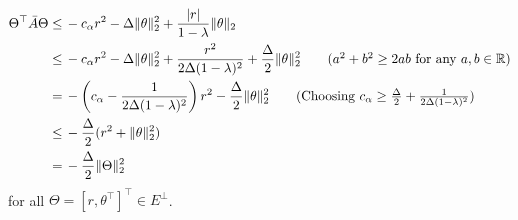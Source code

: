 \documentclass[11 pt]{article}
\begin{document}
\begin{enumerate}
\begin{align}
			\Theta^\top \bar{A}\Theta
			\leq \,&-c_{\alpha}r^2-\Delta\|\theta\|_2^2+\frac{|r|}{1-\lambda}\|\theta\|_2\nonumber\\
			\leq \,&-c_{\alpha}r^2-\Delta\|\theta\|_2^2+\frac{r^2}{2\Delta(1-\lambda)^2}+\frac{\Delta}{2}\|\theta\|_2^2\tag{$a^2+b^2\geq 2ab$ for any $a,b\in\mathbb{R}$}\nonumber\\
			=\,&-\left(c_\alpha-\frac{1}{2\Delta(1-\lambda)^2}\right)r^2-\frac{\Delta}{2}\|\theta\|_2^2\tag{Choosing $c_\alpha\geq \frac{\Delta}{2}+\frac{1}{2\Delta(1-\lambda)^2}$}\nonumber\\
			\leq \,&-\frac{\Delta}{2}(r^2+\|\theta\|_2^2)\nonumber\\
			=\,&-\frac{\Delta}{2}\|\Theta\|_2^2\label{eq:TDLFA_Delta}
		\end{align}
		for all $\Theta=[r,\theta^\top]^\top  \in E^\perp$. 
		

\end{enumerate}
\end{document}
